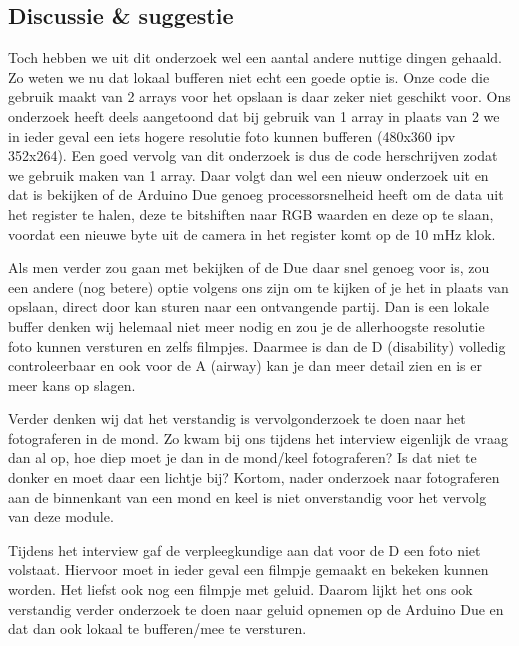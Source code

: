 \documentclass{article}
\begin{document}
\subsection{Discussie \& suggestie}
Toch hebben we uit dit onderzoek wel een aantal andere nuttige dingen gehaald. Zo weten we nu dat lokaal bufferen niet echt een goede optie is. Onze code die gebruik maakt van 2 arrays voor het opslaan is daar zeker niet geschikt voor. Ons onderzoek heeft deels aangetoond dat bij gebruik van 1 array in plaats van 2 we in ieder geval een iets hogere resolutie foto kunnen bufferen (480x360 ipv 352x264). Een goed vervolg van dit onderzoek is dus de code herschrijven zodat we gebruik maken van 1 array. Daar volgt dan wel een nieuw onderzoek uit en dat is bekijken of de Arduino Due genoeg processorsnelheid heeft om de data uit het register te halen, deze te bitshiften naar RGB waarden en deze op te slaan, voordat een nieuwe byte uit de camera in het register komt op de 10 mHz klok.

Als men verder zou gaan met bekijken of de Due daar snel genoeg voor is, zou een andere (nog betere) optie volgens ons zijn om te kijken of je het in plaats van opslaan, direct door kan sturen naar een ontvangende partij. Dan is een lokale buffer denken wij helemaal niet meer nodig en zou je de allerhoogste resolutie foto kunnen versturen en zelfs filmpjes. Daarmee is dan de D (disability) volledig controleerbaar en ook voor de A (airway) kan je dan meer detail zien en is er meer kans op slagen.

Verder denken wij dat het verstandig is vervolgonderzoek te doen naar het fotograferen in de mond. Zo kwam bij ons tijdens het interview eigenlijk de vraag dan al op, hoe diep moet je dan in de mond/keel fotograferen? Is dat niet te donker en moet daar een lichtje bij? Kortom, nader onderzoek naar fotograferen aan de binnenkant van een mond en keel is niet onverstandig voor het vervolg van deze module.

Tijdens het interview gaf de verpleegkundige aan dat voor de D een foto niet volstaat. Hiervoor moet in ieder geval een filmpje gemaakt en bekeken kunnen worden. Het liefst ook nog een filmpje met geluid. Daarom lijkt het ons ook verstandig verder onderzoek te doen naar geluid opnemen op de Arduino Due en dat dan ook lokaal te bufferen/mee te versturen.
\end{document}
